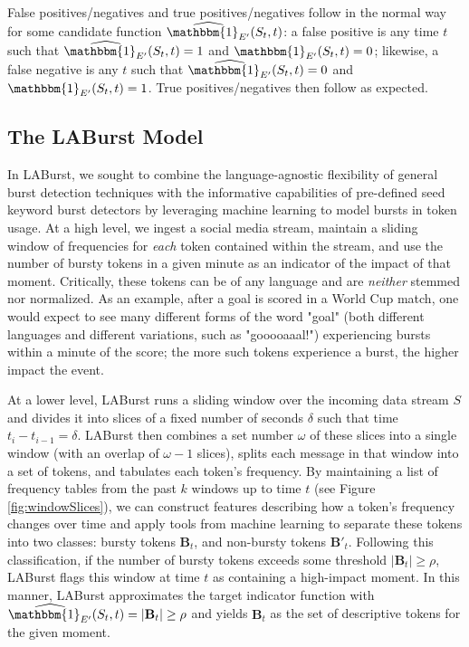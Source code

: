 \documentclass[letterpaper]{article}
\begin{document}
False positives/negatives and true positives/negatives follow in the normal way for some candidate function $\widehat{\mathbbm{1}_{E'}}(S_t, t)$: a false positive is any time $t$ such that $\widehat{\mathbbm{1}_{E'}}(S_t, t) = 1$ and ${\mathbbm{1}_{E'}}(S_t, t) = 0$; likewise, a false negative is any $t$ such that $\widehat{\mathbbm{1}_{E'}}(S_t, t) = 0$ and ${\mathbbm{1}_{E'}}(S_t, t) = 1$.
True positives/negatives then follow as expected.

\subsection{The LABurst Model}

In LABurst, we sought to combine the language-agnostic flexibility of general burst detection techniques with the informative capabilities of pre-defined seed keyword burst detectors by leveraging machine learning to model bursts in token usage.
At a high level, we ingest a social media stream, maintain a sliding window of frequencies for \emph{each} token contained within the stream, and use the number of bursty tokens in a given minute as an indicator of the impact of that moment.
Critically, these tokens can be of any language and are \emph{neither} stemmed nor normalized.
As an example, after a goal is scored in a World Cup match, one would expect to see many different forms of the word "goal" (both different languages and different variations, such as "gooooaaal!") experiencing bursts within a minute of the score; the more such tokens experience a burst, the higher impact the event.

At a lower level, LABurst runs a sliding window over the incoming data stream $S$ and divides it into slices of a fixed number of seconds $\delta$ such that time $t_{i} - t_{i-1} = \delta$.
LABurst then combines a set number $\omega$ of these slices into a single window (with an overlap of $\omega - 1$ slices), splits each message in that window into a set of tokens, and tabulates each token's frequency.
By maintaining a list of frequency tables from the past $k$ windows up to time $t$ (see Figure \ref{fig:windowSlices}), we can construct features describing how a token's frequency changes over time and apply tools from machine learning to separate these tokens into two classes: bursty tokens $\mathbf{B}_t$, and non-bursty tokens $\mathbf{B}'_t$.
Following this classification, if the number of bursty tokens exceeds some threshold $|\mathbf{B}_t| \ge \rho$, LABurst flags this window at time $t$ as containing a high-impact moment.
In this manner, LABurst approximates the target indicator function with $\widehat{\mathbbm{1}_{E'}}(S_t, t) = |\mathbf{B}_t| \ge \rho$ and yields $\mathbf{B}_t$ as the set of descriptive tokens for the given moment.
\end{document}
